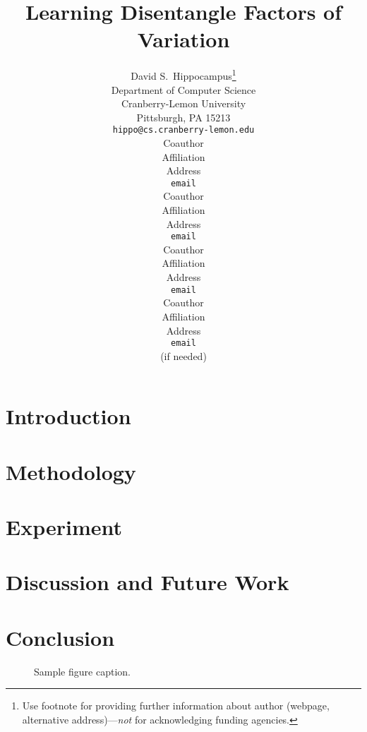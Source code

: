 \documentclass{article} %
\title{Learning Disentangle Factors of Variation}
\author{
David S.~Hippocampus\thanks{ Use footnote for providing further information
about author (webpage, alternative address)---\emph{not} for acknowledging
funding agencies.} \\
Department of Computer Science\\
Cranberry-Lemon University\\
Pittsburgh, PA 15213 \\
\texttt{hippo@cs.cranberry-lemon.edu} \\
\And
Coauthor \\
Affiliation \\
Address \\
\texttt{email} \\
\AND
Coauthor \\
Affiliation \\
Address \\
\texttt{email} \\
\And
Coauthor \\
Affiliation \\
Address \\
\texttt{email} \\
\And
Coauthor \\
Affiliation \\
Address \\
\texttt{email} \\
(if needed)\\
}
\begin{document}
\maketitle
\begin{abstract}

\end{abstract}
\section{Introduction}


\section{Methodology}


\section{Experiment}


\section{Discussion and Future Work}


\section{Conclusion}



\begin{figure}[h]
\begin{center}
\fbox{\rule[-.5cm]{0cm}{4cm} \rule[-.5cm]{4cm}{0cm}}
\end{center}
\caption{Sample figure caption.}
\end{figure}




\end{document}
